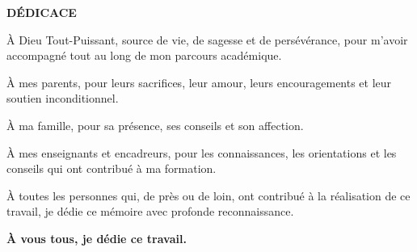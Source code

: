 \cleardoublepage

\begin{center}
	{\Large \textbf{DÉDICACE}}
\end{center}

\vspace{2cm}

\begin{flushleft}
	
	À Dieu Tout-Puissant, source de vie, de sagesse et de
	persévérance, pour m'avoir accompagné tout au long de mon
	parcours académique.
	
	\vspace{0.5cm}
	
	À mes parents, pour leurs sacrifices, leur amour, leurs
	encouragements et leur soutien inconditionnel.
	
	\vspace{0.5cm}
	
	À ma famille, pour sa présence, ses conseils et son affection.
	
	\vspace{0.5cm}
	
	À mes enseignants et encadreurs, pour les connaissances,
	les orientations et les conseils qui ont contribué à ma
	formation.
	
	\vspace{0.5cm}
	
	À toutes les personnes qui, de près ou de loin, ont contribué
	à la réalisation de ce travail, je dédie ce mémoire avec
	profonde reconnaissance.
	
	\vspace{1cm}
	
	\begin{center}
		\textbf{À vous tous, je dédie ce travail.}
	\end{center}
	
\end{flushleft}

\cleardoublepage